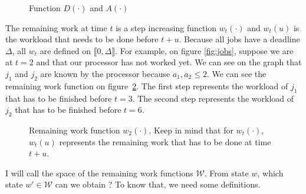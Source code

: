\documentclass[
10pt, %
a4paper, %
oneside, %
headinclude,footinclude, %
BCOR5mm, %
]{scrartcl}
\newcommand{\W}{\mathcal{W}}
\begin{document}
\begin{figure}
  \centering
  \caption{Function $D(\cdot)$ and $A(\cdot)$}
  \label{fig:D}
\end{figure}

The remaining work at time $t$ is a step increasing function
$w_t(\cdot)$ and $w_t(u)$ is the workload that needs to be done before
$t+u$. Because all jobs have a deadline $\Delta$, all $w_t$ are
defined on $\llbracket 0,\Delta\rrbracket$. For example, on figure
\ref{fig:jobs}, suppose we are at $t=2$ and that our processor has not
worked yet. We can see on the graph that $j_1$ and $j_2$ are known by
the processor because $a_1,a_2\leq 2$. We can see the remaining work
function on figure~\ref{fig:workfun}. The first step represents the
workload of $j_1$ that has to be finished before $t=3$. The second
step represents the workload of $j_2$ that has to be finished before
$t=6$. 

\begin{figure}
  \centering
  \caption{Remaining work function $w_2(\cdot)$.
    Keep in mind that for $w_t(\cdot)$, $w_t(u)$ represents the
  remaining work that has to be done at time $t+u$.}
  \label{fig:workfun}
\end{figure}



I will call the space of the remaining work functions $\W$. From state
$w$, which state $w'\in\W$ can we obtain ? To know that, we need some
definitions.
\end{document}
